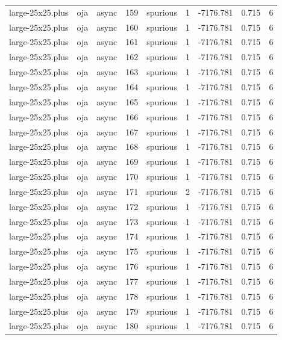 \begin{tabular}{lllrlrrrr}
large-25x25.plus & oja & async & 159 & spurious & 1 & -7176.781 & 0.715 & 6 \\
large-25x25.plus & oja & async & 160 & spurious & 1 & -7176.781 & 0.715 & 6 \\
large-25x25.plus & oja & async & 161 & spurious & 1 & -7176.781 & 0.715 & 6 \\
large-25x25.plus & oja & async & 162 & spurious & 1 & -7176.781 & 0.715 & 6 \\
large-25x25.plus & oja & async & 163 & spurious & 1 & -7176.781 & 0.715 & 6 \\
large-25x25.plus & oja & async & 164 & spurious & 1 & -7176.781 & 0.715 & 6 \\
large-25x25.plus & oja & async & 165 & spurious & 1 & -7176.781 & 0.715 & 6 \\
large-25x25.plus & oja & async & 166 & spurious & 1 & -7176.781 & 0.715 & 6 \\
large-25x25.plus & oja & async & 167 & spurious & 1 & -7176.781 & 0.715 & 6 \\
large-25x25.plus & oja & async & 168 & spurious & 1 & -7176.781 & 0.715 & 6 \\
large-25x25.plus & oja & async & 169 & spurious & 1 & -7176.781 & 0.715 & 6 \\
large-25x25.plus & oja & async & 170 & spurious & 1 & -7176.781 & 0.715 & 6 \\
large-25x25.plus & oja & async & 171 & spurious & 2 & -7176.781 & 0.715 & 6 \\
large-25x25.plus & oja & async & 172 & spurious & 1 & -7176.781 & 0.715 & 6 \\
large-25x25.plus & oja & async & 173 & spurious & 1 & -7176.781 & 0.715 & 6 \\
large-25x25.plus & oja & async & 174 & spurious & 1 & -7176.781 & 0.715 & 6 \\
large-25x25.plus & oja & async & 175 & spurious & 1 & -7176.781 & 0.715 & 6 \\
large-25x25.plus & oja & async & 176 & spurious & 1 & -7176.781 & 0.715 & 6 \\
large-25x25.plus & oja & async & 177 & spurious & 1 & -7176.781 & 0.715 & 6 \\
large-25x25.plus & oja & async & 178 & spurious & 1 & -7176.781 & 0.715 & 6 \\
large-25x25.plus & oja & async & 179 & spurious & 1 & -7176.781 & 0.715 & 6 \\
large-25x25.plus & oja & async & 180 & spurious & 1 & -7176.781 & 0.715 & 6 \\

\end{tabular}
